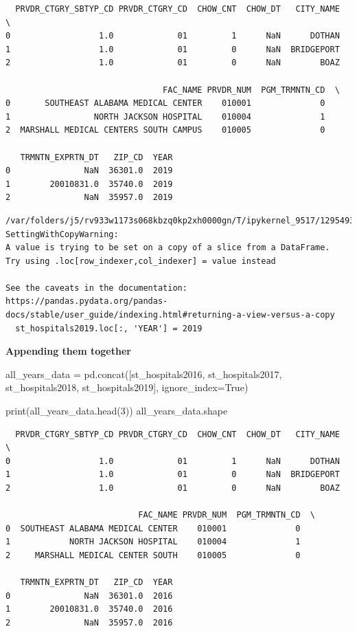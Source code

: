 \documentclass[
  letterpaper,
  DIV=11,
  numbers=noendperiod]{scrartcl}
\newenvironment{Shaded}{\begin{snugshade}}{\end{snugshade}}
\newcommand{\BuiltInTok}[1]{\textcolor[rgb]{0.00,0.23,0.31}{#1}}
\newcommand{\DecValTok}[1]{\textcolor[rgb]{0.68,0.00,0.00}{#1}}
\newcommand{\NormalTok}[1]{\textcolor[rgb]{0.00,0.23,0.31}{#1}}
\newcommand{\OperatorTok}[1]{\textcolor[rgb]{0.37,0.37,0.37}{#1}}
\newcommand{\VariableTok}[1]{\textcolor[rgb]{0.07,0.07,0.07}{#1}}
\begin{document}
\begin{verbatim}
  PRVDR_CTGRY_SBTYP_CD PRVDR_CTGRY_CD  CHOW_CNT  CHOW_DT   CITY_NAME  \
0                  1.0             01         1      NaN      DOTHAN   
1                  1.0             01         0      NaN  BRIDGEPORT   
2                  1.0             01         0      NaN        BOAZ   

                                FAC_NAME PRVDR_NUM  PGM_TRMNTN_CD  \
0       SOUTHEAST ALABAMA MEDICAL CENTER    010001              0   
1                 NORTH JACKSON HOSPITAL    010004              1   
2  MARSHALL MEDICAL CENTERS SOUTH CAMPUS    010005              0   

   TRMNTN_EXPRTN_DT   ZIP_CD  YEAR  
0               NaN  36301.0  2019  
1        20010831.0  35740.0  2019  
2               NaN  35957.0  2019  
\end{verbatim}

\begin{verbatim}
/var/folders/j5/rv933w1173s068kbzq0kp2xh0000gn/T/ipykernel_9517/1295493316.py:1: SettingWithCopyWarning: 
A value is trying to be set on a copy of a slice from a DataFrame.
Try using .loc[row_indexer,col_indexer] = value instead

See the caveats in the documentation: https://pandas.pydata.org/pandas-docs/stable/user_guide/indexing.html#returning-a-view-versus-a-copy
  st_hospitals2019.loc[:, 'YEAR'] = 2019
\end{verbatim}

\textbf{Appending them together}

\begin{Shaded}
\begin{Highlighting}[]
\NormalTok{all\_years\_data }\OperatorTok{=}\NormalTok{ pd.concat([st\_hospitals2016, st\_hospitals2017, st\_hospitals2018, st\_hospitals2019], ignore\_index}\OperatorTok{=}\VariableTok{True}\NormalTok{)}

\BuiltInTok{print}\NormalTok{(all\_years\_data.head(}\DecValTok{3}\NormalTok{))}
\NormalTok{all\_years\_data.shape}
\end{Highlighting}
\end{Shaded}

\begin{verbatim}
  PRVDR_CTGRY_SBTYP_CD PRVDR_CTGRY_CD  CHOW_CNT  CHOW_DT   CITY_NAME  \
0                  1.0             01         1      NaN      DOTHAN   
1                  1.0             01         0      NaN  BRIDGEPORT   
2                  1.0             01         0      NaN        BOAZ   

                           FAC_NAME PRVDR_NUM  PGM_TRMNTN_CD  \
0  SOUTHEAST ALABAMA MEDICAL CENTER    010001              0   
1            NORTH JACKSON HOSPITAL    010004              1   
2     MARSHALL MEDICAL CENTER SOUTH    010005              0   

   TRMNTN_EXPRTN_DT   ZIP_CD  YEAR  
0               NaN  36301.0  2016  
1        20010831.0  35740.0  2016  
2               NaN  35957.0  2016  
\end{verbatim}
\end{document}
